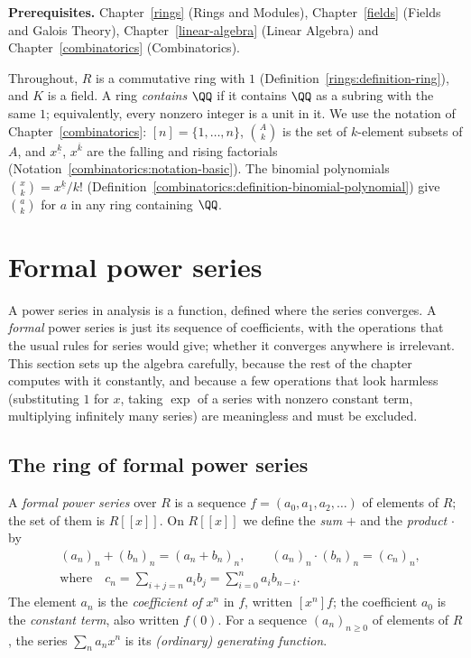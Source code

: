 \noindent\textbf{Prerequisites.} Chapter~\ref{rings} (Rings and Modules), Chapter~\ref{fields} (Fields and Galois Theory), Chapter~\ref{linear-algebra} (Linear Algebra) and
Chapter~\ref{combinatorics} (Combinatorics).

\begin{notation}\label{generating-functions:notation-basic}
Throughout, $R$ is a commutative ring with $1$ (Definition~\ref{rings:definition-ring}), and $K$ is a field. A ring \emph{contains $\QQ$} if it contains $\QQ$ as a subring with the same $1$;
equivalently, every nonzero integer is a unit in it. We use the notation of Chapter~\ref{combinatorics}: $[n] = \{1, \ldots, n\}$, $\binom{A}{k}$ is the set of $k$-element subsets of $A$, and
$x^{\underline{k}}$, $x^{\overline{k}}$ are the falling and rising factorials (Notation~\ref{combinatorics:notation-basic}). The binomial polynomials $\binom{x}{k} = x^{\underline{k}}/k!$
(Definition~\ref{combinatorics:definition-binomial-polynomial}) give $\binom{a}{k}$ for $a$ in any ring containing $\QQ$.
\end{notation}

\section{Formal power series}\label{generating-functions:section-formal-power-series}

A power series in analysis is a function, defined where the series converges. A \emph{formal} power series is just its sequence of coefficients, with the operations that the usual rules for
series would give; whether it converges anywhere is irrelevant. This section sets up the algebra carefully, because the rest of the chapter computes with it constantly, and because a few
operations that look harmless (substituting $1$ for $x$, taking $\exp$ of a series with nonzero constant term, multiplying infinitely many series) are meaningless and must be excluded.

\subsection{The ring of formal power series}\label{generating-functions:subsection-ring}

\begin{definition}\label{generating-functions:definition-power-series}
A \emph{formal power series} over $R$ is a sequence $f = (a_0, a_1, a_2, \ldots)$ of elements of $R$; the set of them is $R[[x]]$. On $R[[x]]$ we define the \emph{sum} $+$ and the \emph{product}
$\cdot$ by
\[
\begin{aligned}
&(a_n)_n + (b_n)_n = (a_n + b_n)_n, \qquad (a_n)_n \cdot (b_n)_n = (c_n)_n,\\
&\text{where}\quad c_n = \sum_{i + j = n}a_ib_j = \sum_{i=0}^{n}a_ib_{n-i}.
\end{aligned}
\]
The element $a_n$ is the \emph{coefficient of $x^n$} in $f$, written $[x^n]f$; the coefficient $a_0$ is the \emph{constant term}, also written $f(0)$. For a sequence $(a_n)_{n \geq 0}$ of
elements of $R$, the series $\sum_na_nx^n$ is its \emph{(ordinary) generating function}.
\end{definition}

